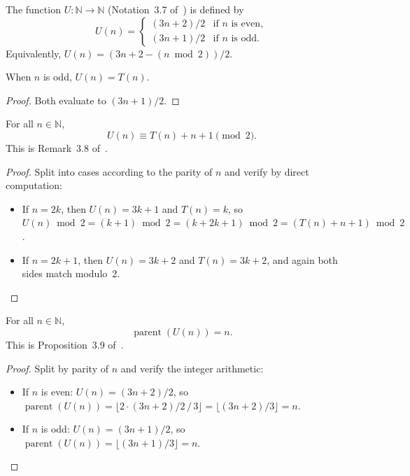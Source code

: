 \begin{definition}\label{def:U}\leanok
The function $U : \mathbb{N} \to \mathbb{N}$ (Notation~3.7 of~\cite{eli25}) is defined by
\[
  U(n) =
  \begin{cases}
    (3n + 2)/2 & \text{if } n \text{ is even}, \\
    (3n + 1)/2 & \text{if } n \text{ is odd}.
  \end{cases}
\]
Equivalently, $U(n) = (3n + 2 - (n \bmod 2))/2$.
\end{definition}

\begin{lemma}\label{lemma:U_odd_eq_T}\leanok
When $n$ is odd, $U(n) = T(n)$.
\end{lemma}
\begin{proof}\leanok
Both evaluate to $(3n + 1)/2$.
\end{proof}

\begin{lemma}\label{lemma:U_mod_two}\leanok
For all $n \in \mathbb{N}$,
\[
  U(n) \equiv T(n) + n + 1 \pmod{2}.
\]
This is Remark~3.8 of~\cite{eli25}.
\end{lemma}
\begin{proof}\leanok
Split into cases according to the parity of $n$ and verify by direct computation:
\begin{itemize}
  \item If $n = 2k$, then $U(n) = 3k+1$ and $T(n) = k$, so $U(n) \bmod 2 = (k+1) \bmod 2 = (k + 2k + 1) \bmod 2 = (T(n) + n + 1) \bmod 2$.
  \item If $n = 2k+1$, then $U(n) = 3k+2$ and $T(n) = 3k+2$, and again both sides match modulo~$2$.
\end{itemize}
\end{proof}

\begin{lemma}\label{lemma:parent_U}\leanok
For all $n \in \mathbb{N}$,
\[
  \operatorname{parent}(U(n)) = n.
\]
This is Proposition~3.9 of~\cite{eli25}.
\end{lemma}
\begin{proof}\leanok
Split by parity of $n$ and verify the integer arithmetic:
\begin{itemize}
  \item If $n$ is even: $U(n) = (3n+2)/2$, so $\operatorname{parent}(U(n)) = \lfloor 2 \cdot (3n+2)/2 \,/\, 3 \rfloor = \lfloor (3n+2)/3 \rfloor = n$.
  \item If $n$ is odd: $U(n) = (3n+1)/2$, so $\operatorname{parent}(U(n)) = \lfloor (3n+1)/3 \rfloor = n$.
\end{itemize}
\end{proof}

